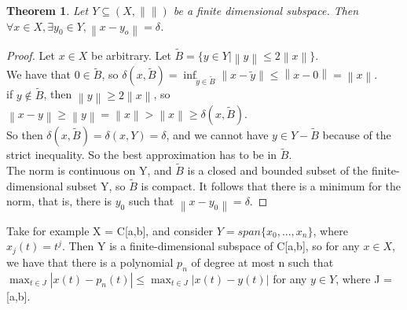 \documentclass[12pt]{extarticle}
\newcommand{\norm}[1]{\left\lVert #1 \right\rVert}
\newtheorem{theorem}{Theorem}
\begin{document}
\begin{theorem}
	Let $Y\subseteq (X,\norm{})$ be a finite dimensional subspace. Then 
	$\forall x\in X, \exists y_0\in Y, \norm{x-y_o} = \delta$.
\end{theorem}
\begin{proof}
	Let $x\in X$ be arbitrary.
	Let $\tilde{B} = \{y\in Y | \norm{y} \leq 2 \norm{x} \}$.\\
	We have that $0\in \tilde{B}$, so $\delta(x,\tilde{B}) = \inf_{\tilde{y}\in\tilde{B}}\norm{x-\tilde{y}} \leq \norm{x-0} = \norm{x}$.\\
	if $y\notin \tilde{B}$, then $\norm{y} \geq 2\norm{x}$, so 
	$\norm{x-y} \geq \norm{y} = \norm{x} > \norm{x} \geq \delta(x, \tilde{B})$.\\
	So then $\delta(x,\tilde{B}) = \delta(x,Y) = \delta$, and we cannot have $y\in Y-\tilde{B}$ because of the strict inequality. So the best approximation has to be in $\tilde{B}$.\\
	The norm is continuous on Y, and $\tilde{B}$ is a closed and bounded subset of the finite-dimensional subset Y, so $\tilde{B}$ is compact. It follows that there is a minimum for the norm, that is, there is $y_0$ such that $\norm{x-y_0} = \delta$.
\end{proof}
Take for example X = C[a,b], and consider $Y=span\{x_0,...,x_n\}$, where $x_j(t) = t^j$. Then Y is a finite-dimensional subspace of C[a,b], so for any 
$x\in X$, we have that there is a polynomial $p_n$ of degree at most n such that $\max_{t\in J}|x(t) - p_n(t)| \leq \max_{t\in J} |x(t) - y(t)|$ for any $y\in Y$, where J = [a,b].
\end{document}
